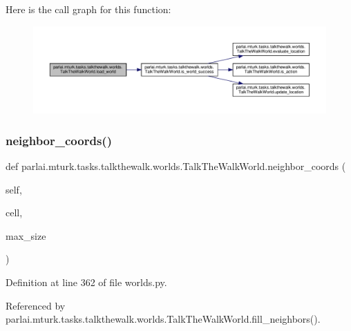 Here is the call graph for this function\+:
\nopagebreak
\begin{figure}[H]
\begin{center}
\leavevmode
\includegraphics[width=350pt]{classparlai_1_1mturk_1_1tasks_1_1talkthewalk_1_1worlds_1_1TalkTheWalkWorld_aed8d5a0a3e3457f2334b33726912586c_cgraph}
\end{center}
\end{figure}
\mbox{\label{classparlai_1_1mturk_1_1tasks_1_1talkthewalk_1_1worlds_1_1TalkTheWalkWorld_ae4bf42eec01e7f4d6e37fd2e9c55e4b0}} 
\subsubsection{\texorpdfstring{neighbor\+\_\+coords()}{neighbor\_coords()}}
{\footnotesize\ttfamily def parlai.\+mturk.\+tasks.\+talkthewalk.\+worlds.\+Talk\+The\+Walk\+World.\+neighbor\+\_\+coords (\begin{DoxyParamCaption}\item[{}]{self,  }\item[{}]{cell,  }\item[{}]{max\+\_\+size }\end{DoxyParamCaption})}



Definition at line 362 of file worlds.\+py.



Referenced by parlai.\+mturk.\+tasks.\+talkthewalk.\+worlds.\+Talk\+The\+Walk\+World.\+fill\+\_\+neighbors().

